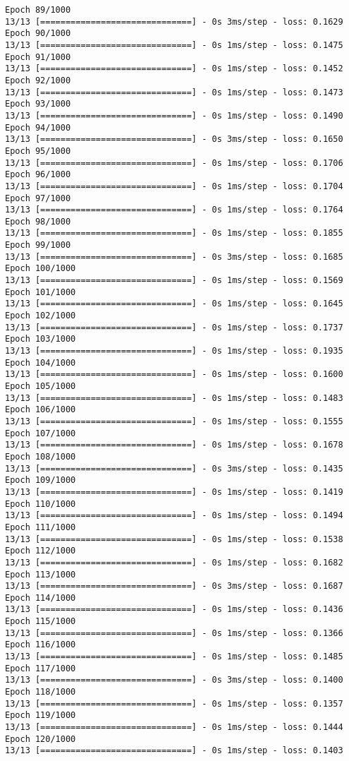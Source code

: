 \documentclass[11pt]{article}
\begin{document}
\begin{Verbatim}[commandchars=\\\{\}]
Epoch 89/1000
13/13 [==============================] - 0s 3ms/step - loss: 0.1629
Epoch 90/1000
13/13 [==============================] - 0s 1ms/step - loss: 0.1475
Epoch 91/1000
13/13 [==============================] - 0s 1ms/step - loss: 0.1452
Epoch 92/1000
13/13 [==============================] - 0s 1ms/step - loss: 0.1473
Epoch 93/1000
13/13 [==============================] - 0s 1ms/step - loss: 0.1490
Epoch 94/1000
13/13 [==============================] - 0s 3ms/step - loss: 0.1650
Epoch 95/1000
13/13 [==============================] - 0s 1ms/step - loss: 0.1706
Epoch 96/1000
13/13 [==============================] - 0s 1ms/step - loss: 0.1704
Epoch 97/1000
13/13 [==============================] - 0s 1ms/step - loss: 0.1764
Epoch 98/1000
13/13 [==============================] - 0s 1ms/step - loss: 0.1855
Epoch 99/1000
13/13 [==============================] - 0s 3ms/step - loss: 0.1685
Epoch 100/1000
13/13 [==============================] - 0s 1ms/step - loss: 0.1569
Epoch 101/1000
13/13 [==============================] - 0s 1ms/step - loss: 0.1645
Epoch 102/1000
13/13 [==============================] - 0s 1ms/step - loss: 0.1737
Epoch 103/1000
13/13 [==============================] - 0s 1ms/step - loss: 0.1935
Epoch 104/1000
13/13 [==============================] - 0s 1ms/step - loss: 0.1600
Epoch 105/1000
13/13 [==============================] - 0s 1ms/step - loss: 0.1483
Epoch 106/1000
13/13 [==============================] - 0s 1ms/step - loss: 0.1555
Epoch 107/1000
13/13 [==============================] - 0s 1ms/step - loss: 0.1678
Epoch 108/1000
13/13 [==============================] - 0s 3ms/step - loss: 0.1435
Epoch 109/1000
13/13 [==============================] - 0s 1ms/step - loss: 0.1419
Epoch 110/1000
13/13 [==============================] - 0s 1ms/step - loss: 0.1494
Epoch 111/1000
13/13 [==============================] - 0s 1ms/step - loss: 0.1538
Epoch 112/1000
13/13 [==============================] - 0s 1ms/step - loss: 0.1682
Epoch 113/1000
13/13 [==============================] - 0s 3ms/step - loss: 0.1687
Epoch 114/1000
13/13 [==============================] - 0s 1ms/step - loss: 0.1436
Epoch 115/1000
13/13 [==============================] - 0s 1ms/step - loss: 0.1366
Epoch 116/1000
13/13 [==============================] - 0s 1ms/step - loss: 0.1485
Epoch 117/1000
13/13 [==============================] - 0s 3ms/step - loss: 0.1400
Epoch 118/1000
13/13 [==============================] - 0s 1ms/step - loss: 0.1357
Epoch 119/1000
13/13 [==============================] - 0s 1ms/step - loss: 0.1444
Epoch 120/1000
13/13 [==============================] - 0s 1ms/step - loss: 0.1403

\end{Verbatim}
\end{document}
